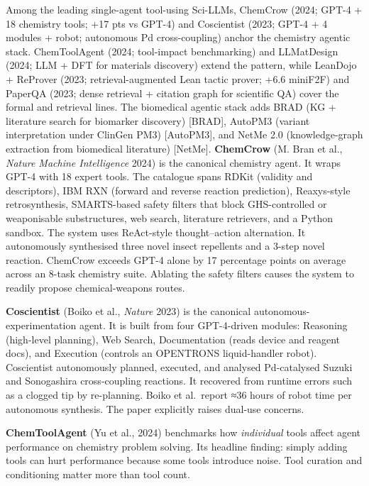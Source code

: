 \documentclass{article}
\begin{document}
Among the leading single-agent tool-using Sci-LLMs, ChemCrow (2024; GPT-4 + 18 chemistry tools; +17 pts vs GPT-4) \cite{bran2024naturemachineintel} and Coscientist (2023; GPT-4 + 4 modules + robot; autonomous Pd cross-coupling) \cite{boiko2023nature6242023} anchor the chemistry agentic stack. ChemToolAgent (2024; tool-impact benchmarking) \cite{yu2024chemtoolagenttheim} and LLMatDesign (2024; LLM + DFT for materials discovery) \cite{jia2024arxiv2406131632024} extend the pattern, while LeanDojo + ReProver (2023; retrieval-augmented Lean tactic prover; +6.6 miniF2F) \cite{yang2023leandojotheorempro} and PaperQA (2023; dense retrieval + citation graph for scientific QA) \cite{ala2023arxiv2312075592023} cover the formal and retrieval lines. The biomedical agentic stack adds BRAD (KG + literature search for biomarker discovery) {[}BRAD{]}, AutoPM3 (variant interpretation under ClinGen PM3) {[}AutoPM3{]}, and NetMe 2.0 (knowledge-graph extraction from biomedical literature) {[}NetMe{]}. \textbf{ChemCrow} (M. Bran et al., \emph{Nature Machine Intelligence} 2024) \cite{bran2024naturemachineintel} is the canonical chemistry agent. It wraps GPT-4 with 18 expert tools. The catalogue spans RDKit (validity and descriptors), IBM RXN (forward and reverse reaction prediction), Reaxys-style retrosynthesis, SMARTS-based safety filters that block GHS-controlled or weaponisable substructures, web search, literature retrievers, and a Python sandbox. The system uses ReAct-style thought--action alternation. It autonomously synthesised three novel insect repellents and a 3-step novel reaction. ChemCrow exceeds GPT-4 alone by 17 percentage points on average across an 8-task chemistry suite. Ablating the safety filters causes the system to readily propose chemical-weapons routes.

\textbf{Coscientist} (Boiko et al., \emph{Nature} 2023) \cite{boiko2023nature6242023} is the canonical autonomous-experimentation agent. It is built from four GPT-4-driven modules: Reasoning (high-level planning), Web Search, Documentation (reads device and reagent docs), and Execution (controls an OPENTRONS liquid-handler robot). Coscientist autonomously planned, executed, and analysed Pd-catalysed Suzuki and Sonogashira cross-coupling reactions. It recovered from runtime errors such as a clogged tip by re-planning. Boiko et al.~report ≈36 hours of robot time per autonomous synthesis. The paper explicitly raises dual-use concerns.

\textbf{ChemToolAgent} (Yu et al., 2024) \cite{yu2024chemtoolagenttheim} benchmarks how \emph{individual} tools affect agent performance on chemistry problem solving. Its headline finding: simply adding tools can hurt performance because some tools introduce noise. Tool curation and conditioning matter more than tool count.
\end{document}
